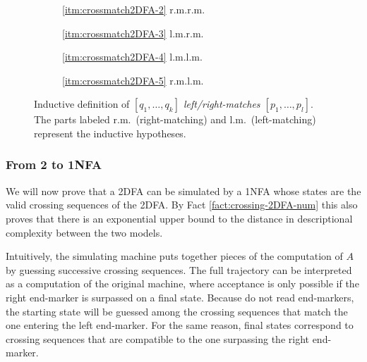 \begin{figure}
	\centering
	\begin{subfigure}{0.246\textwidth}
		\centering
		
		\caption*{\ref{itm:crossmatch2DFA-2} r.m.\tto r.m.}
	\end{subfigure}
	\hfill
	\begin{subfigure}{0.242\textwidth}
		\centering
		
		\caption*{\ref{itm:crossmatch2DFA-3} l.m.\tto r.m.}
	\end{subfigure}
	\hfill
	\begin{subfigure}{0.242\textwidth}
		\centering
		
		\caption*{\ref{itm:crossmatch2DFA-4} l.m.\tto l.m.}
	\end{subfigure}
	\hfill
	\begin{subfigure}{0.246\textwidth}
		\centering
		
		\caption*{\ref{itm:crossmatch2DFA-5} r.m.\tto l.m.}
	\end{subfigure}
	\caption{Inductive definition of \emph{$[q_1,\dots,q_k]$ left/right-matches $[p_1,\dots,p_l]$}. The parts labeled r.m.\ (right-matching) and l.m.\ (left-matching) represent the inductive hypotheses.}
	\label{fig:2DFA-crossmatch}
\end{figure}

\subsubsection{From 2\DFAs{} to 1NFA}
We will now prove that a 2DFA can be simulated by a 1NFA whose states are the valid crossing sequences of the 2DFA.
By Fact \ref{fact:crossing-2DFA-num} this also proves that there is an exponential upper bound to the distance in descriptional complexity between the two models.

Intuitively, the simulating machine puts together pieces of the computation of $A$ by guessing successive crossing sequences.
The full trajectory can be interpreted as a computation of the original machine, where acceptance is only possible if the right end-marker is surpassed on a final state.
Because \NFAs{} do not read end-markers, the starting state will be guessed among the crossing sequences that match the one entering the left end-marker.
For the same reason, final states correspond to crossing sequences that are compatible to the one surpassing the right end-marker.

